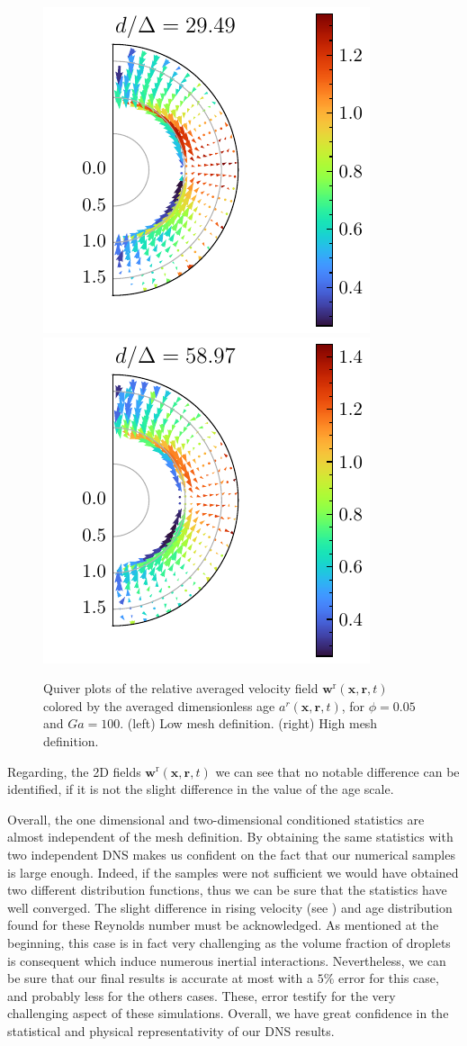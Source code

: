 \begin{figure}[h!]
    \centering
    \includegraphics[height = 0.3\textwidth]{image/HOMOGENEOUS_NEW/VAL/U_rel_ndc_25.pdf}
    \includegraphics[height = 0.3\textwidth]{image/HOMOGENEOUS_NEW/VAL/U_rel_ndc_35.pdf}
    \caption{Quiver plots of the relative averaged velocity field $\textbf{w}^\text{r}(\textbf{x},\textbf{r},t)$ colored by the averaged dimensionless age $a^r(\textbf{x},\textbf{r},t)$, for $\phi = 0.05$ and $Ga = 100$. 
    (left) Low mesh definition.
    (right) High mesh definition. 
    }
    \label{fig:velap}
\end{figure}
Regarding, the 2D fields  $\textbf{w}^\text{r}(\textbf{x},\textbf{r},t)$ we can see that no notable difference can be identified, if it is not the slight difference in the value of the age scale. 


Overall, the one dimensional and two-dimensional conditioned statistics are almost independent of the mesh definition. 
By obtaining the same statistics with two independent DNS makes us confident on the fact that our numerical samples is large enough.
Indeed, if the samples were not sufficient we would have obtained two different distribution functions, thus we can be sure that the statistics have well converged. 
The slight difference in rising velocity (see \citet[Appendix A]{fintzi2024buoyancy}) and age distribution found for these Reynolds number must be acknowledged.
As mentioned at the beginning, this case is in fact very challenging as the volume fraction of droplets is consequent which induce numerous inertial interactions. 
Nevertheless, we can be sure that our final results is accurate at most with a $5\%$ error for this case, and probably less for the others cases. 
These, error testify for the very challenging  aspect of these simulations. 
Overall, we have great confidence in the statistical and physical representativity of our DNS results. 